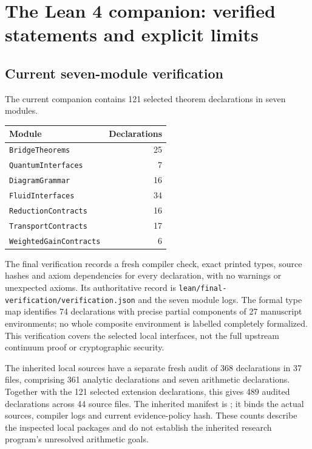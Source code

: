 \chapter{The Lean 4 companion: verified statements and explicit limits}

\section{Current seven-module verification}

The current companion contains 121 selected theorem declarations in seven
modules.
\begin{center}
\begin{tabular}{lr}
\toprule
Module & Declarations\\\midrule
\texttt{BridgeTheorems} & 25\\
\texttt{QuantumInterfaces} & 7\\
\texttt{DiagramGrammar} & 16\\
\texttt{FluidInterfaces} & 34\\
\texttt{ReductionContracts} & 16\\
\texttt{TransportContracts} & 17\\
\texttt{WeightedGainContracts} & 6\\\bottomrule
\end{tabular}
\end{center}
The final verification records a fresh compiler check, exact printed types,
source hashes and axiom dependencies for every declaration, with no warnings
or unexpected axioms. Its authoritative record is
\texttt{lean/final-verification/verification.json} and the seven module logs.
The formal type map identifies 74 declarations with precise partial
components of 27 manuscript environments; no whole composite environment is
labelled completely formalized. This verification covers the selected local
interfaces, not the full upstream continuum proof or cryptographic security.

The inherited local sources have a separate fresh audit of 368 declarations
in 37 files, comprising 361 analytic declarations and seven arithmetic
declarations. Together with the 121 selected extension declarations, this
gives 489 audited declarations across 44 source files. The inherited
manifest is ;
it binds the actual sources, compiler logs and current evidence-policy
hash. These counts describe the inspected local packages and do not
establish the inherited research program's unresolved arithmetic goals.

